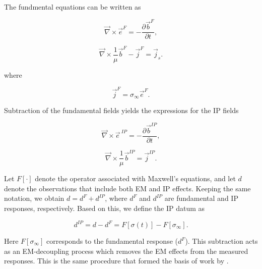 \documentclass[extra,mreferee]{gji}
\newcommand{\curl}{{\vec \nabla}\times}
\newcommand{\siginf}{\sigma_\infty}
\renewcommand {\j}  { {\vec j} }
\renewcommand {\b}  { {\vec b} }
\newcommand {\e}  { {\vec e} }
\newcommand{\dip}{d^{IP}}
\begin{document}
The fundmental equations can be written as
\begin{linenomath*}
\begin{equation}
  \curl \e^{F} = -\frac{\partial \b^{F}}{\partial t},
  \label{eq: eq_primary_farad}
\end{equation}
\end{linenomath*}
\begin{linenomath*}
\begin{equation}
  \curl{\frac{1}{\mu}\b^{F}} -\j^{F} = \j_s.
  \label{eq: eq_primary_coulomb}
\end{equation}
\end{linenomath*}
where
\begin{linenomath*}
\begin{equation}
  \j^{F} = \siginf\e^{F}.
  \label{eq: jF}
\end{equation}
\end{linenomath*}

Subtraction of the fundamental fields yields the expressions for the IP fields
\begin{linenomath*}
\begin{equation}
  \curl \e^{\ IP} = -\frac{\partial \b^{IP}}{\partial t},
  \label{eq: eq_secondary_farad}
\end{equation}
\end{linenomath*}
\begin{linenomath*}
\begin{equation}
  \curl{\frac{1}{\mu}\b^{IP}} = \j^{IP}.
  \label{eq: eq_secondary_coulomb}
\end{equation}
\end{linenomath*}

Let $F[\cdot]$ denote the operator associated with Maxwell’s equations, and let $d$ denote the observations that include both EM and IP effects.
Keeping the same notation, we obtain $d = d^{F} + \dip$, where $d^F$ and $\dip$ are fundamental and IP responses, respectively.
Based on this, we define the IP datum as
\begin{linenomath*}
\begin{equation}
  \dip = d - d^{F} = F[\sigma(t)]-F[\siginf].
    \label{eq: IPdatum_syn}
\end{equation}
\end{linenomath*}
Here $F[\siginf]$ corresponds to the fundamental response ($d^F$).
This subtraction acts as an EM-decoupling process which removes the EM effects from the measured responses. This is the same procedure that formed the basis of work by \cite{routh2001}.
\end{document}
